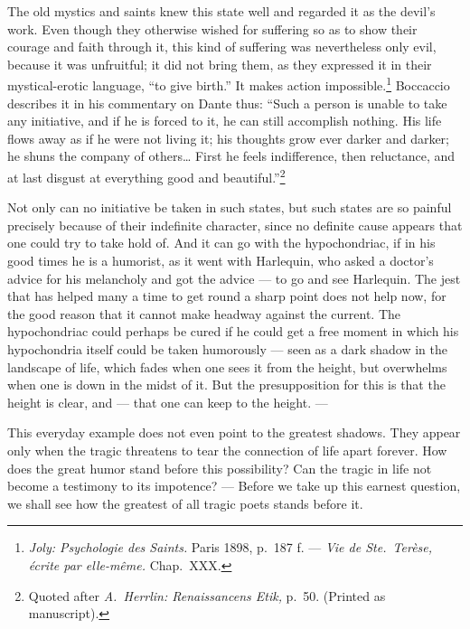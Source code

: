 \documentclass[12pt]{book}
\newcommand{\opage}[1]{\marginnote{\footnotesize\textit{[#1]}}}
\begin{document}
The old mystics and saints knew this state well and regarded it as the devil's work.
Even though they otherwise wished for suffering so as to show their courage and faith
through it, this kind of suffering was nevertheless only evil, because it was
unfruitful; it did not bring them, as they expressed it in their mystical-erotic
language, ``to give birth.'' It makes action impossible.\footnote{\textit{Joly:
Psychologie des Saints.} Paris 1898, p.~187 f. --- \textit{Vie de Ste.\ Terèse,
écrite par elle-même.} Chap.~XXX.} Boccaccio describes it in his commentary on Dante
thus: ``Such a person is unable to take any initiative, and if he is forced to it, he
can still accomplish nothing. His life flows away as if \opage{97}he were not living it;
his thoughts grow ever darker and darker; he shuns the company of others\dots{} First he
feels indifference, then reluctance, and at last disgust at everything good and
beautiful.''\footnote{Quoted after \textit{A.~Herrlin: Renaissancens Etik,} p.~50.
(Printed as manuscript).}

Not only can no initiative be taken in such states, but such states are so painful
precisely because of their indefinite character, since no definite cause appears that
one could try to take hold of. And it can go with the hypochondriac, if in his good
times he is a humorist, as it went with Harlequin, who asked a doctor's advice for his
melancholy and got the advice --- to go and see Harlequin. The jest that has helped many
a time to get round a sharp point does not help now, for the good reason that it cannot
make headway against the current. The hypochondriac could perhaps be cured if he could
get a free moment in which his hypochondria itself could be taken humorously --- seen as
a dark shadow in the landscape of life, which fades when one sees it from the height,
but overwhelms when one is down in the midst of it. But the presupposition for this is
that the height is clear, and --- that one can keep to the height. ---

This everyday example does not even point to the greatest shadows. They appear only when
the tragic threatens to tear the connection of life apart forever. How does the great
humor stand before this possibility? Can the tragic in life not become a testimony to
its impotence? --- Before we take up this earnest question, we shall see how the greatest
of all tragic poets stands before it.
\end{document}
